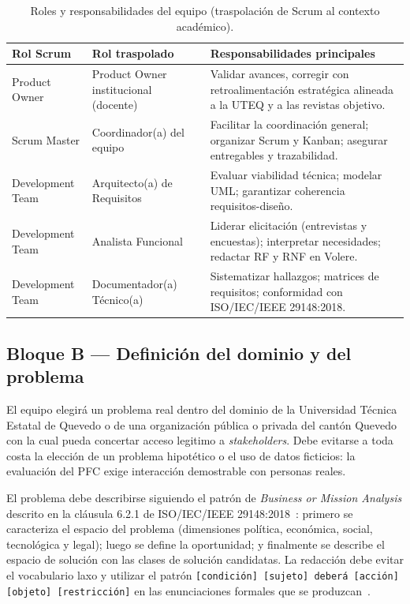 \documentclass[11pt,a4paper]{article}
\begin{document}
\begin{table}[htbp]
\centering
\caption{Roles y responsabilidades del equipo (traspolaci\'on de Scrum al contexto acad\'emico).}
\label{tab:roles}
\begin{tabularx}{\textwidth}{L{3.3cm}L{3.3cm}X}
\toprule
{}
\textbf{Rol Scrum} & \textbf{Rol traspolado} & \textbf{Responsabilidades principales}\\
\midrule
Product Owner & Product Owner institucional (docente) & Validar avances, corregir con retroalimentaci\'on estrat\'egica alineada a la UTEQ y a las revistas objetivo.\\
Scrum Master & Coordinador(a) del equipo & Facilitar la coordinaci\'on general; organizar Scrum y Kanban; asegurar entregables y trazabilidad.\\
Development Team & Arquitecto(a) de Requisitos & Evaluar viabilidad t\'ecnica; modelar UML; garantizar coherencia requisitos-dise\~no.\\
Development Team & Analista Funcional & Liderar elicitaci\'on (entrevistas y encuestas); interpretar necesidades; redactar RF y RNF en Volere.\\
Development Team & Documentador(a) T\'ecnico(a) & Sistematizar hallazgos; matrices de requisitos; conformidad con ISO/IEC/IEEE 29148:2018.\\
\bottomrule
\end{tabularx}
\end{table}

\subsection{Bloque B --- Definici\'on del dominio y del problema}

El equipo elegir\'a un problema real dentro del dominio de la Universidad T\'ecnica Estatal de Quevedo o de una organizaci\'on p\'ublica o privada del cant\'on Quevedo con la cual pueda concertar acceso legitimo a \emph{stakeholders}. Debe evitarse a toda costa la elecci\'on de un problema hipot\'etico o el uso de datos ficticios: la evaluaci\'on del PFC exige interacci\'on demostrable con personas reales.

El problema debe describirse siguiendo el patr\'on de \emph{Business or Mission Analysis} descrito en la cl\'ausula 6.2.1 de ISO/IEC/IEEE 29148:2018~\cite{iso29148}: primero se caracteriza el espacio del problema (dimensiones pol\'itica, econ\'omica, social, tecnol\'ogica y legal); luego se define la oportunidad; y finalmente se describe el espacio de soluci\'on con las clases de soluci\'on candidatas. La redacci\'on debe evitar el vocabulario laxo y utilizar el patr\'on \texttt{[condici\'on] [sujeto] deber\'a [acci\'on] [objeto] [restricci\'on]} en las enunciaciones formales que se produzcan~\cite{iso29148,pohl2010requirements}.
\end{document}
